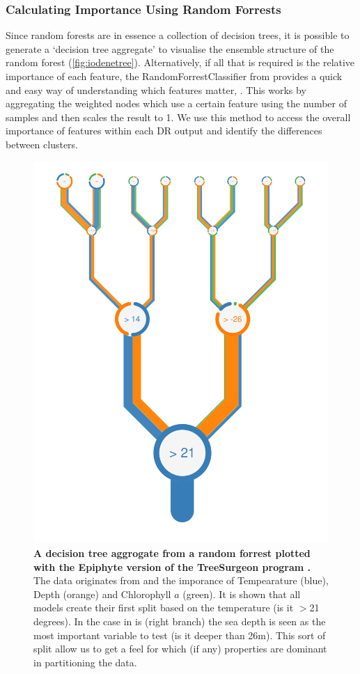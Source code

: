 \subsubsection{Calculating Importance Using Random Forrests}
Since random forests are in essence a collection of decision trees, it is possible to generate a `decision tree aggregate' to visualise the ensemble structure of the random forest \citep{forrester} (\autoref{fig:iodenetree}). Alternatively, if all that is required is the relative importance of each feature, the RandomForrestClassifier from \cite{sklearn} provides a quick and easy way of understanding which features matter,
\citep{handsonml}. This works by aggregating the weighted nodes which use a certain feature using the number of samples and then scales the result to 1. We use this method to access the overall importance of features within each DR output and identify the differences between clusters.


\begin{figure}[H]
     \centering
         \includegraphics[width=.55\textwidth]{4fig/Oi_prj_features_of_RFR(TEMP+DEPTH+ChlrA)_for_depth_5_white.pdf}
        \caption{\textbf{A decision tree aggrogate from a random forrest plotted with the Epiphyte version of the TreeSurgeon program \citep{forrester}.} The data originates from \cite{iodene} and the imporance of Tempearature (blue), Depth (orange) and Chlorophyll $a$ (green). It is shown that all models create their first split based on the temperature (is it $>$21 degrees). In the case in is (right branch) the sea depth is seen as the most important variable to test (is it deeper than 26m). This sort of split allow us to get a feel for which (if any) properties are dominant in partitioning the data. }
        \label{fig:iodenetree}
\end{figure}


